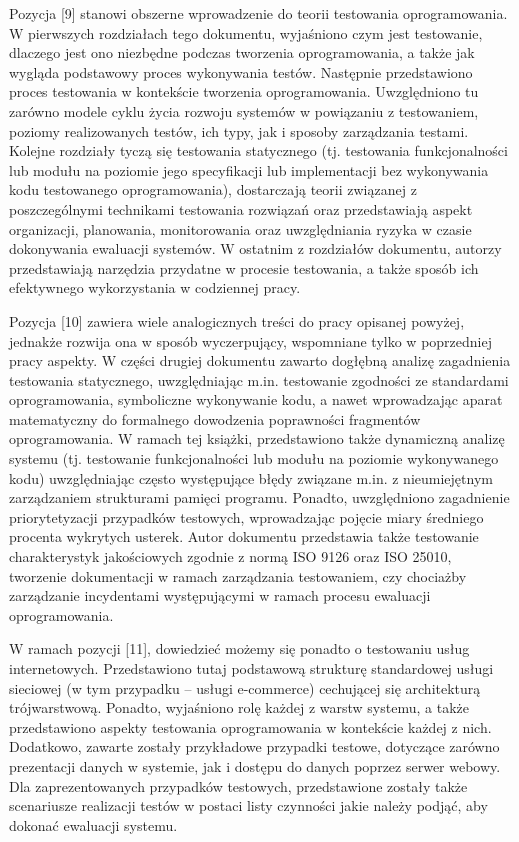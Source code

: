 Pozycja [9] stanowi obszerne wprowadzenie do teorii testowania oprogramowania. W pierwszych rozdziałach tego dokumentu, wyjaśniono czym jest testowanie, dlaczego jest ono niezbędne podczas tworzenia oprogramowania, a także jak wygląda podstawowy proces wykonywania testów. Następnie przedstawiono proces testowania w kontekście tworzenia oprogramowania. Uwzględniono tu zarówno modele cyklu życia rozwoju systemów w powiązaniu z testowaniem, poziomy realizowanych testów, ich typy, jak i sposoby zarządzania testami. Kolejne rozdziały tyczą się testowania statycznego (tj. testowania funkcjonalności lub modułu na poziomie jego specyfikacji lub implementacji bez wykonywania kodu testowanego oprogramowania), dostarczają teorii związanej z poszczególnymi technikami testowania rozwiązań oraz przedstawiają aspekt organizacji, planowania, monitorowania oraz uwzględniania ryzyka w czasie dokonywania ewaluacji systemów. W ostatnim z rozdziałów dokumentu, autorzy przedstawiają narzędzia przydatne w procesie testowania, a także sposób ich efektywnego wykorzystania w codziennej pracy.

Pozycja [10] zawiera wiele analogicznych treści do pracy opisanej powyżej, jednakże rozwija ona w sposób wyczerpujący, wspomniane tylko w poprzedniej pracy aspekty. W części drugiej dokumentu zawarto dogłębną analizę zagadnienia testowania statycznego, uwzględniając m.in. testowanie zgodności ze standardami oprogramowania, symboliczne wykonywanie kodu, a nawet wprowadzając aparat matematyczny do formalnego dowodzenia poprawności fragmentów oprogramowania. W ramach tej książki, przedstawiono także dynamiczną analizę systemu (tj. testowanie funkcjonalności lub modułu na poziomie wykonywanego kodu) uwzględniając często występujące błędy związane m.in. z nieumiejętnym zarządzaniem strukturami pamięci programu. Ponadto, uwzględniono zagadnienie priorytetyzacji przypadków testowych, wprowadzając pojęcie miary średniego procenta wykrytych usterek. Autor dokumentu przedstawia także testowanie charakterystyk jakościowych zgodnie z normą ISO 9126 oraz ISO 25010, tworzenie dokumentacji w ramach zarządzania testowaniem, czy chociażby zarządzanie incydentami występującymi w ramach procesu ewaluacji oprogramowania.

W ramach pozycji [11], dowiedzieć możemy się ponadto o testowaniu usług internetowych. Przedstawiono tutaj podstawową strukturę standardowej usługi sieciowej (w tym przypadku – usługi e-commerce) cechującej się architekturą trójwarstwową. Ponadto, wyjaśniono rolę każdej z warstw systemu, a także przedstawiono aspekty testowania oprogramowania w kontekście każdej z nich. Dodatkowo, zawarte zostały przykładowe przypadki testowe, dotyczące zarówno prezentacji danych w systemie, jak i dostępu do danych poprzez serwer webowy. Dla zaprezentowanych przypadków testowych, przedstawione zostały także scenariusze realizacji testów w postaci listy czynności jakie należy podjąć, aby dokonać ewaluacji systemu.

